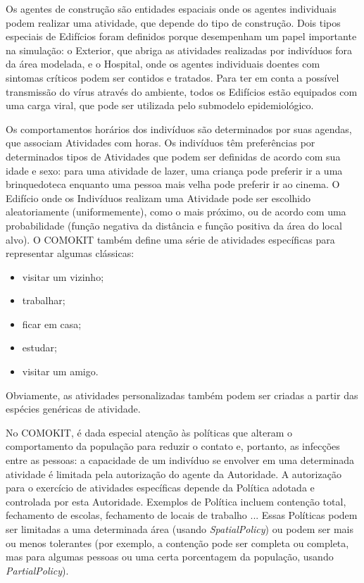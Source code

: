 
Os agentes de construção são entidades espaciais onde os agentes individuais podem realizar uma atividade, que depende do tipo de construção. Dois tipos especiais de Edifícios foram definidos porque desempenham um papel importante na simulação: o Exterior, que abriga as atividades realizadas por indivíduos fora da área modelada, e o Hospital, onde os agentes individuais doentes com sintomas críticos podem ser contidos e tratados. Para ter em conta a possível transmissão do vírus através do ambiente, todos os Edifícios estão equipados com uma carga viral, que pode ser utilizada pelo submodelo epidemiológico. \cite{gaudou2020comokit}

Os comportamentos horários dos indivíduos são determinados por suas agendas, que associam Atividades com horas. Os indivíduos têm preferências por determinados tipos de Atividades que podem ser definidas de acordo com sua idade e sexo: para uma atividade de lazer, uma criança pode preferir ir a uma brinquedoteca enquanto uma pessoa mais velha pode preferir ir ao cinema. O Edifício onde os Indivíduos realizam uma Atividade pode ser escolhido aleatoriamente (uniformemente), como o mais próximo, ou de acordo com uma probabilidade (função negativa da distância e função positiva da área do local alvo). O COMOKIT também define uma série de atividades específicas para representar algumas clássicas: 
\begin{itemize}
\item visitar um vizinho;
\item trabalhar;
\item ficar em casa;
\item estudar;
\item visitar um amigo.
\end{itemize}

Obviamente, as atividades personalizadas também podem ser criadas a partir das espécies genéricas de atividade. \cite{gaudou2020comokit}

No COMOKIT, é dada especial atenção às políticas que alteram o comportamento da população para reduzir o contato e, portanto, as infecções entre as pessoas: a capacidade de um indivíduo se envolver em uma determinada atividade é limitada pela autorização do agente da Autoridade. A autorização para o exercício de atividades específicas depende da Política adotada e controlada por esta Autoridade. Exemplos de Política incluem contenção total, fechamento de escolas, fechamento de locais de trabalho ... Essas Políticas podem ser limitadas a uma determinada área (usando \textit{SpatialPolicy}) ou podem ser mais ou menos tolerantes (por exemplo, a contenção pode ser completa ou completa, mas para algumas pessoas ou uma certa porcentagem da população, usando \textit{PartialPolicy}). \cite{gaudou2020comokit}


